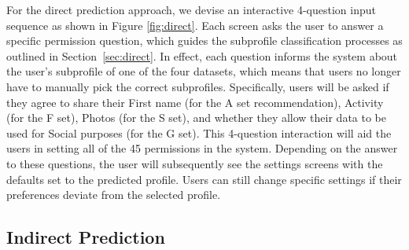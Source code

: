 For the direct prediction approach, we devise an interactive 4-question input sequence as shown in Figure \ref{fig:direct}. Each screen asks the user to answer a specific permission question, which guides the subprofile classification processes as outlined in Section~\ref{sec:direct}. In effect, each question informs the system about the user's subprofile of one of the four datasets, which means that users no longer have to manually pick the correct subprofiles. Specifically, users will be asked if they agree to share their First name (for the A set recommendation), Activity (for the F set), Photos (for the S set), and whether they allow their data to be used for Social purposes (for the G set). This 4-question interaction will aid the users in setting all of the 45 permissions in the system. Depending on the answer to these questions, the user will subsequently see the settings screens with the defaults set to the predicted profile. Users can still change specific settings if their preferences deviate from the selected profile.

%	




\subsection{Indirect Prediction}
\label{sec:indirect}

%	

